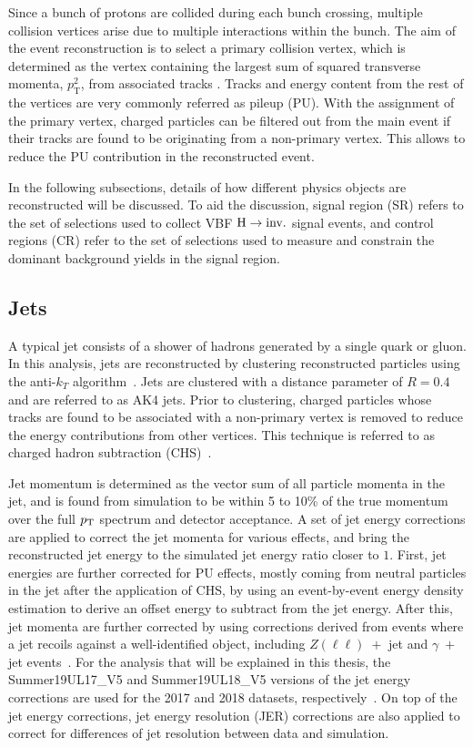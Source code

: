 Since a bunch of protons are collided during each bunch crossing, multiple collision vertices arise
due to multiple interactions within the bunch. The aim of the event reconstruction is to select a primary
collision vertex, which is determined as the vertex containing the largest sum of squared transverse momenta,
$p_{\textrm{T}}^2$, from associated tracks \cite{cms:phase2_upgrade}.
Tracks and energy content from the rest of the vertices are very commonly referred as pileup (PU). With the assignment of the
primary vertex, charged particles can be filtered out from the main event if their tracks are found to be originating 
from a non-primary vertex. This allows to reduce the PU contribution in the reconstructed event. 

In the following subsections, details of how different physics objects are reconstructed will be discussed. To aid the
discussion, signal region (SR) refers to the set of selections used to collect VBF $\textrm{H} \rightarrow \textrm{inv.}$ signal events,
and control regions (CR) refer to the set of selections used to measure and constrain the dominant background yields
in the signal region.

\subsection{Jets}
\label{sec:objects_jets}

A typical jet consists of a shower of hadrons generated by a single quark or gluon.
In this analysis, jets are reconstructed by clustering reconstructed particles
using the anti-$k_{T}$ algorithm~\cite{Cacciari:2008gp}. Jets are
clustered with a distance parameter of $R = 0.4$ and are referred to as AK4
jets. Prior to clustering, charged particles whose tracks are found to be associated
with a non-primary vertex is removed to reduce the energy contributions from other
vertices. This technique is referred to as charged hadron subtraction (CHS)~\cite{CMS:2014ata}. 

Jet momentum is determined as the vector sum of all particle momenta
in the jet, and is found from simulation to be within 5 to 10\% of the
true momentum over the full $p_{\textrm{T}}$ spectrum and detector acceptance. 
A set of jet energy corrections are applied to correct the jet momenta for various effects,
and bring the reconstructed jet energy to the simulated jet energy ratio closer to $1$.
First, jet energies are further corrected for PU effects, mostly coming from neutral 
particles in the jet after the application of CHS, by using an event-by-event energy density estimation
to derive an offset energy to subtract from the jet energy.
After this, jet momenta are further corrected by using corrections derived from events
where a jet recoils against a well-identified object, including $Z(\ell\ell)\;+$ jet and
$\gamma\;+$ jet events~\cite{Khachatryan:2016kdb}. 
For the analysis that will be explained in this thesis, the
Summer19UL17\_V5 and Summer19UL18\_V5 versions of
the jet energy corrections are used for the 2017 and 2018 datasets,
respectively~\cite{JME:JECRecommendations}. On top of the jet energy corrections,
jet energy resolution (JER) corrections are also applied to correct for differences of 
jet resolution between data and simulation.

